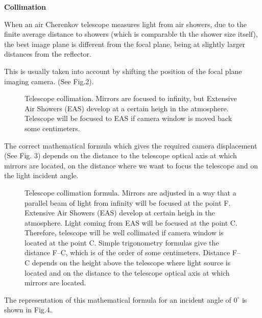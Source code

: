 {\vspace{1.0cm}

{\bf Collimation}

When an air Cherenkov telescope measures light from air showers, due to the finite average distance to showers (which is comparable th the shower size itself), the best image plane is different from the focal plane, being at slightly larger distances from the reflector.

This is usually taken into account by shifting the position of the focal plane imaging camera. (See Fig.2).

   \begin{figure}[h]\centering
   \leavevmode
   \epsfxsize=6cm
   \caption{\tiny{Telescope collimation. Mirrors are focused to infinity, but Extensive Air Showers (EAS) develop at a certain heigh
   in the atmosphere. Telescope will be focused to EAS if camera window is moved back some centimeters.}}
   \end{figure}


 The correct mathematical formula which gives the required camera displacement (See Fig. 3) depends on the distance to the telescope optical axis at 
which mirrors are located, on the distance where we want to focus the telescope and on the light incident angle. 
   \begin{figure}[h]\centering
   \leavevmode
   \epsfxsize=10cm

   \caption{\tiny{Telescope collimation formula. Mirrors are adjusted in a way that a parallel beam of light from infinity will be
focused at the point F. Extensive Air Showers (EAS) develop at certain heigh in the atmosphere. Light coming from EAS will
be focused at the point C. Therefore, telescope will be well collimated if camera window is located at the point C. Simple
trigonometry formulas give the distance F--C, which is of the order of some centimeters. Distance F--C depends on the height
above the telescope where light source is located and on the distance to the telescope optical axis at which mirrors are located.}}

   \end{figure}


The representation of this mathematical formula for an incident angle of $0^{\circ}$ is shown in Fig.4.

}
